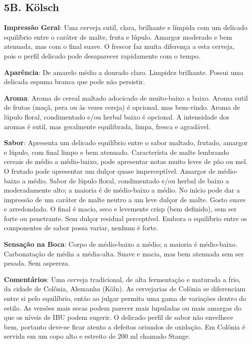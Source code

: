 \subsection*{5B. Kölsch}

\textbf{Impressão Geral}: Uma cerveja sutil, clara, brilhante e límpida com um delicado equilíbrio entre o caráter de malte, fruta e lúpulo. Amargor moderado e bem atenuada, mas com o final suave. O frescor faz muita diferença a esta cerveja, pois o perfil delicado pode desaparecer rapidamente com o tempo.

\textbf{Aparência}: De amarelo médio a dourado claro. Limpidez brilhante. Possui uma delicada espuma branca que pode não persistir.

\textbf{Aroma}: Aroma de cereal maltado adocicado de muito-baixo a baixo. Aroma sutil de frutas (maçã, pera ou às vezes cereja) é opcional, mas bem-vindo. Aroma de lúpulo floral, condimentado e/ou herbal baixo é opcional. A intensidade dos aromas é sutil, mas geralmente equilibrada, limpa, fresca e agradável.

\textbf{Sabor}: Apresenta um delicado equilíbrio entre o sabor maltado, frutado, amargor e lúpulo, com final limpo e bem atenuado. Característa de malte lembrando cereais de médio a médio-baixo, pode apresentar notas muito leves de pão ou mel. O frutado pode apresentar um dulçor quase imperceptível. Amargor de médio-baixo a médio. Sabor de lúpulo floral, condimentado e/ou herbal de baixo a moderadamente alto; a maioria é de médio-baixo a médio. No início pode dar a impressão de um caráter de malte neutro a um leve dulçor de malte. Gosto suave e arredondado. O final é macio, seco e levemente crisp (bem definido), sem ser forte ou penetrante. Sem dulçor residual perceptível. Embora o equilíbrio entre os componentes de sabor possa variar, nenhum é forte.

\textbf{Sensação na Boca}: Corpo de médio-baixo a médio; a maioria é médio-baixo. Carbonatação de média a média-alta. Suave e macia, mas bem atenuada sem ser pesada. Sem aspereza.

\textbf{Comentários}: Uma cerveja tradicional, de alta fermentação e maturada a frio, da cidade de Colônia, Alemanha (Köln). As cervejarias de Colônia se diferenciam entre si pelo equilíbrio, então ao julgar permita uma gama de variações dentro do estilo. As versões mais secas podem parecer mais lupuladas ou mais amargas do que os níveis de IBU podem sugerir. O delicado perfil de sabor não envelhece bem, portanto deve-se ficar atento a defeitos oriundos de oxidação. Em Colônia é servida em um copo alto e estreito de 200 ml chamado Stange.

